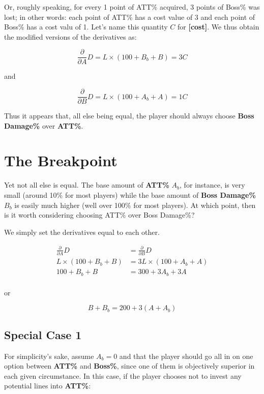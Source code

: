 \documentclass{article}
\begin{document}
Or, roughly speaking, for every 1 point of ATT\% acquired, 3 points of Boss\% was lost; in other words: each point of ATT\% has a cost value of 3 and each point of Boss\% has a cost valu of 1. Let's name this quantity $C$ for \textbf{[cost]}. We thus obtain the modified versions of the derivatives as:

\begin{equation} \label{eq:2}
    \frac{\partial}{\partial A} D = L \times (100 + B_b + B) = 3C
\end{equation}

and

\begin{equation} \label{eq:3}
    \frac{\partial}{\partial B} D = L \times (100 + A_b + A) = 1C
\end{equation}

Thus it appears that, all else being equal, the player should always choose \textbf{Boss Damage\%} over \textbf{ATT\%}.

\section{The Breakpoint}

Yet not all else is equal. The base amount of \textbf{ATT\%} \textbf{$A_b$}, for instance, is very small (around 10\% for most players) while the base amount of \textbf{Boss Damage\%} \textbf{$B_b$} is easily much higher (well over 100\% for most players). At which point, then is it worth considering choosing ATT\% over Boss Damage\%?

We simply set the derivatives equal to each other.

\begin{align*}
    \frac{\partial}{\partial A} D & = \frac{\partial}{\partial B} D \\
        L \times (100 + B_b + B) & = 3L \times (100 + A_b + A) \\
        100 + B_b + B & = 300 + 3A_b + 3A \\
\end{align*}

or

\begin{equation} \label{eq:4}
    B + B_b = 200 + 3(A+A_b)
\end{equation}

\subsection{Special Case 1}
For simplicity's sake, assume $A_b = 0$ and that the player should go all in on one option between \textbf{ATT\%} and \textbf{Boss\%}, since one of them is objectively superior in each given circumstance. In this case, if the player chooses not to invest any potential lines into \textbf{ATT\%}:
\end{document}
